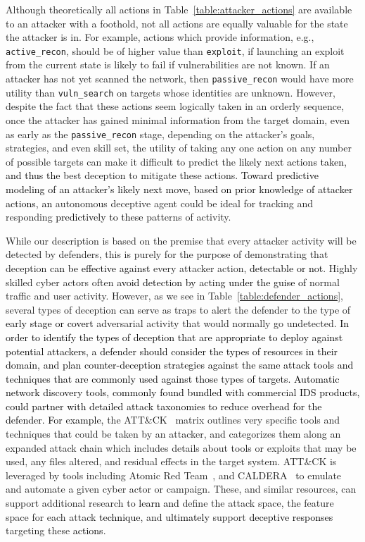 \documentclass{article}
\newcommand\mmm[1]{\textcolor{black}{#1}}
\newcommand\nnn[1]{\textcolor{black}{#1}}
\begin{document}
Although theoretically all actions in Table~\ref{table:attacker_actions} are available to an attacker with a foothold, not all actions are equally valuable for the state the attacker is in. For example, actions which provide information, e.g., \texttt{active\_recon}, should be of higher value than \texttt{exploit}, if launching an exploit from the current state is likely to fail if vulnerabilities are not known. If an attacker has not yet scanned the network, then \texttt{passive\_recon} would have more utility than \texttt{vuln\_search} on targets whose identities are unknown. 
However, despite the fact that these actions seem logically taken in an orderly sequence, once the attacker has gained minimal information from the target domain, even as early as the \texttt{passive\_recon} stage, depending on the attacker's goals, strategies, and even skill set, the utility of taking any one action on any number of possible targets can make it difficult to predict the \nnn{likely next actions taken, and thus the} best deception to mitigate these actions. 
\mmm{Toward predictive modeling of an attacker's likely next move, based on prior knowledge of attacker actions, an} autonomous deceptive agent could be ideal for tracking and responding \mmm{predictively to these} patterns of activity.

While our description is based on the premise that every attacker activity will be detected by defenders, this is purely for the purpose of demonstrating that deception \nnn{can be effective against} every attacker action, \mmm{detectable or not}. Highly skilled cyber actors often \mmm{avoid detection by acting under the guise of} normal traffic and user activity. However, as we see in Table~\ref{table:defender_actions}, several types of deception can serve as traps to alert the defender to the type of \mmm{early stage or covert} adversarial activity that would normally go undetected. 
\mmm{In order to identify the types of deception that are appropriate to deploy against potential attackers, a defender should consider the types of resources in their domain, and plan counter-deception strategies against the same attack tools and techniques that are commonly used against those types of targets. Automatic network discovery tools, commonly found bundled with commercial IDS products, could partner with detailed attack taxonomies to reduce overhead for the defender. For example,} the ATT\&CK~\cite{mitre_attck} matrix outlines very specific tools and techniques that could be taken by an attacker, and categorizes them along an expanded attack chain which includes details about tools or exploits that may be used, any files altered, and residual effects in the target system. 
ATT\&CK is leveraged by tools including Atomic Red Team~\cite{atomicredteam}, and CALDERA\texttrademark~\cite{mitre_caldera} to emulate and automate a given cyber actor or campaign. These, and similar resources, can support additional research to \mmm{learn and} define the attack space, the feature space for each attack \mmm{technique}, and \mmm{ultimately} support \nnn{deceptive responses} targeting these \nnn{actions}.
\end{document}
